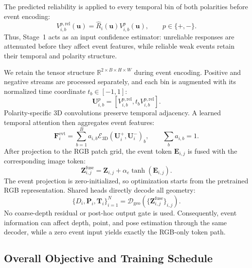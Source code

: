 The predicted reliability is applied to every temporal bin of both polarities
before event encoding:
\begin{equation}
    V_{i,b}^{p,\mathrm{rel}}(\bm u)=
    \widehat R_i(\bm u)V_{i,b}^{p}(\bm u),
    \qquad p\in\{+,-\}.
    \label{eq:weighted_event_voxel}
\end{equation}
Thus, Stage~1 acts as an input confidence estimator: unreliable responses are
attenuated before they affect event features, while reliable weak events retain
their temporal and polarity structure.

We retain the tensor structure
$\mathbb{R}^{2\times B\times H\times W}$ during event encoding. Positive and
negative streams are processed separately, and each bin is augmented with its
normalized time coordinate $t_b\in[-1,1]$:
\begin{equation}
    \bm U_{i,b}^{p}=
    [V_{i,b}^{p,\mathrm{rel}},t_bV_{i,b}^{p,\mathrm{rel}}].
\end{equation}
Polarity-specific 3D convolutions preserve temporal adjacency. A learned
temporal attention then aggregates event features:
\begin{equation}
    \bm F_i^{\mathrm{evt}}=
    \sum_{b=1}^{B}a_{i,b}
    \mathcal E_{3\mathrm D}(\bm U_i^+,\bm U_i^-)_b,
    \qquad \sum_b a_{i,b}=1.
    \label{eq:temporal_polarity_encoding}
\end{equation}
After projection to the RGB patch grid, the event token $\bm E_{i,j}$ is fused
with the corresponding image token:
\begin{equation}
    \bm Z_{i,j}^{\mathrm{fuse}}=
    \bm Z_{i,j}+\alpha_e\tanh(\bm E_{i,j}).
    \label{eq:direct_token_fusion}
\end{equation}
The event projection is zero-initialized, so optimization starts from the
pretrained RGB representation. Shared heads directly decode all geometry:
\begin{equation}
    \boxed{
    \{D_i,\bm P_i,\bm T_i\}_{i=1}^{N}=
    \mathcal D_{\mathrm{geo}}
    (\{\bm Z_{i,j}^{\mathrm{fuse}}\}_{i,j})}.
    \label{eq:direct_geometry_decoding}
\end{equation}
No coarse-depth residual or post-hoc output gate is used. Consequently, event
information can affect depth, point, and pose estimation through the same
decoder, while a zero event input yields exactly the RGB-only token path.

\subsection{Overall Objective and Training Schedule}
\label{sec:training_objective}

